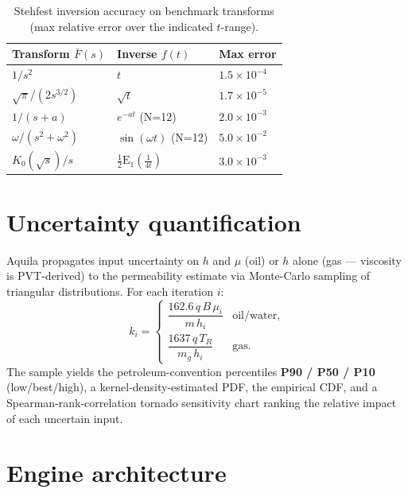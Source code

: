 \documentclass[11pt,a4paper]{article}
\newcommand{\Ein}{\mathrm{E}_1}
\begin{document}
\begin{table}[h]
\centering
\caption{Stehfest inversion accuracy on benchmark transforms (max relative error over the indicated $t$-range).}
\label{tab:stehfest}
\begin{tabular}{lll}
\toprule
\textbf{Transform $\bar F(s)$} & \textbf{Inverse $f(t)$} & \textbf{Max error} \\
\midrule
$1/s^2$              & $t$                            & $1.5\times10^{-4}$ \\
$\sqrt{\pi}/(2s^{3/2})$ & $\sqrt{t}$                   & $1.7\times10^{-5}$ \\
$1/(s+a)$            & $e^{-at}$ (N=12)              & $2.0\times10^{-3}$ \\
$\omega/(s^2+\omega^2)$ & $\sin(\omega t)$ (N=12)    & $5.0\times10^{-2}$ \\
$K_0(\sqrt s)/s$    & $\tfrac{1}{2}\Ein\!\left(\tfrac{1}{4t}\right)$ & $3.0\times10^{-3}$ \\
\bottomrule
\end{tabular}
\end{table}

\section{Uncertainty quantification}
\label{sec:uncertainty}

Aquila propagates input uncertainty on $h$ and $\mu$ (oil) or $h$ alone
(gas — viscosity is PVT-derived) to the permeability estimate via
Monte-Carlo sampling of triangular distributions. For each iteration
$i$:
\begin{equation}
    k_i = \begin{cases}
        \dfrac{162.6\,q\,B\,\mu_i}{m\,h_i} & \text{oil/water,} \\[1ex]
        \dfrac{1637\,q\,T_R}{m_g\,h_i}      & \text{gas.}
    \end{cases}
\end{equation}
The sample yields the petroleum-convention percentiles
\textbf{P90 / P50 / P10} (low/best/high), a kernel-density-estimated
PDF, the empirical CDF, and a Spearman-rank-correlation tornado
sensitivity chart ranking the relative impact of each uncertain
input.

\section{Engine architecture}
\label{sec:arch}
\end{document}
